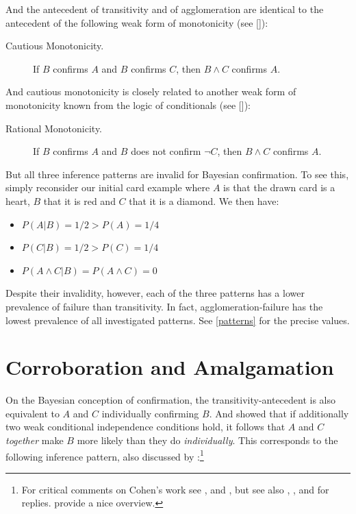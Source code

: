 \documentclass[a4paper,11pt]{article}
\begin{document}
\noindent And the antecedent of transitivity and of agglomeration are identical to the antecedent of the following weak form of monotonicity (see \citeauthor{Gabbay1985} [\citeyear{Gabbay1985}]):

\begin{description}
\item[Cautious Monotonicity.] If $B$ confirms $A$ and $B$ confirms $C$, then $B\land C$  confirms \nolinebreak $A$. 
\end{description}

\noindent And cautious monotonicity is closely related to another weak form of monotonicity known from the logic of conditionals (see \citeauthor{Lewis1973} [\citeyear{Lewis1973}]):

\begin{description}
\item[Rational Monotonicity.] If $B$ confirms $A$ and $B$ does not confirm $\neg C$, then $B\land C$ confirms $A$.
\end{description}

\noindent But all three inference patterns are invalid for Bayesian confirmation. To see this, simply reconsider our initial card example where $A$ is that the drawn card is a heart, $B$ that it is red and $C$ that it is a diamond. We then have:

\begin{itemize}
\item $P(A|B)=1/2>P(A)=1/4$
\item $P(C|B)=1/2> P(C)=1/4$ 
\item $P(A\land C|B)=P(A\land C)=0$
\end{itemize}


\noindent Despite their invalidity, however, each of the three patterns has a lower prevalence of failure than transitivity. In fact, agglomeration-failure has the lowest prevalence of all investigated patterns. See \autoref{patterns} for the precise values. 

\section{Corroboration and Amalgamation}
\label{sec7}

On the Bayesian conception of confirmation, the transitivity-antecedent is also equivalent to $A$ and $C$ individually confirming $B$. And \cite{Cohen1977} showed that if additionally two weak conditional independence conditions hold, it follows that $A$ and $C$ \emph{together} make $B$ more likely than they do \emph{individually}. This corresponds to the following inference pattern, also discussed by \cite{Wagner2013}:\footnote{For critical comments on Cohen's work see \cite{Oneill1982}, \cite{Falk1986} and \cite{Schlesinger1988}, but see also \cite{Cohen1982}, \cite{Cohen1986}, \cite{Cohen1991} and \cite{Wagner1991} for replies. \cite{AtkinsonManuscript} provide a nice overview.}
 
\end{document}
